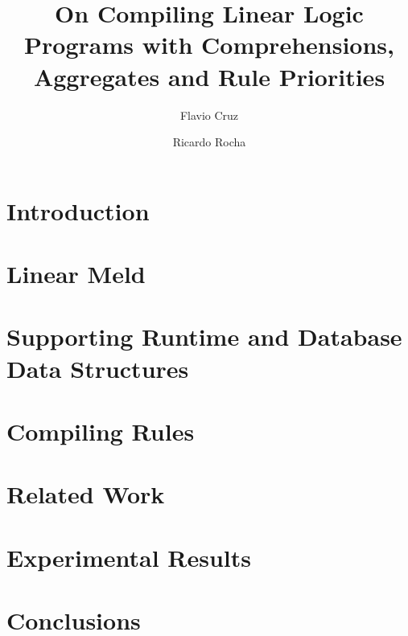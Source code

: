 \documentclass{llncs}
\begin{document}
\newcommand{\cmu}{\ensuremath{^\dag}}
\newcommand{\fcup}{\ensuremath{^\ddag}}
\pagestyle{headings}  %
\mainmatter              %
%
\title{On Compiling Linear Logic Programs with Comprehensions, Aggregates and Rule
Priorities}
%
\author{Flavio Cruz \and Ricardo Rocha}


\maketitle

\begin{abstract}

\end{abstract}

\section{Introduction}


\section{Linear Meld}


\section{Supporting Runtime and Database Data Structures}\label{sec:data_structures}



\section{Compiling Rules}\label{sec:compile}


\section{Related Work}


\section{Experimental Results}\label{results}


\section{Conclusions}






\end{document}
